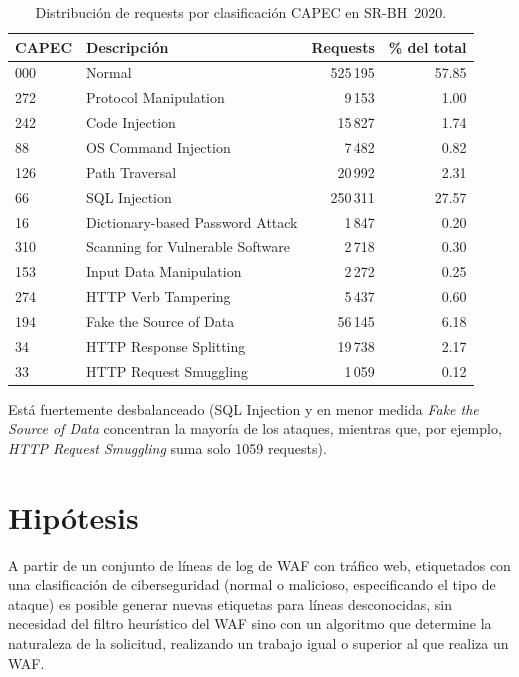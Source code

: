 \documentclass[12pt, a4paper]{article}
\begin{document}
\begin{table}[t]
\centering
\caption{Distribución de requests por clasificación CAPEC en SR-BH~2020.}
\label{tab:srbh-capec}
\begin{tabular}{llrr}
\toprule
CAPEC & Descripción & Requests & \% del total \\
\midrule
000 & Normal                              & 525\,195 & 57.85 \\
272 & Protocol Manipulation               &   9\,153 &  1.00 \\
242 & Code Injection                      &  15\,827 &  1.74 \\
88  & OS Command Injection                &   7\,482 &  0.82 \\
126 & Path Traversal                      &  20\,992 &  2.31 \\
66  & SQL Injection                       & 250\,311 & 27.57 \\
16  & Dictionary-based Password Attack    &   1\,847 &  0.20 \\
310 & Scanning for Vulnerable Software    &   2\,718 &  0.30 \\
153 & Input Data Manipulation             &   2\,272 &  0.25 \\
274 & HTTP Verb Tampering                 &   5\,437 &  0.60 \\
194 & Fake the Source of Data             &  56\,145 &  6.18 \\
34  & HTTP Response Splitting             &  19\,738 &  2.17 \\
33  & HTTP Request Smuggling              &   1\,059 &  0.12 \\
\bottomrule
\end{tabular}
\end{table}

Está fuertemente desbalanceado (SQL Injection y en menor medida \textit{Fake the Source of Data} concentran la mayoría de los ataques, mientras que, por ejemplo, \textit{HTTP Request Smuggling} suma solo 1059 requests).

\section{Hipótesis}

\vspace{0.2cm}
A partir de un conjunto de líneas de log de WAF con tráfico web, etiquetados con una clasificación de ciberseguridad (normal o malicioso, especificando el tipo de ataque) es posible generar nuevas etiquetas para líneas desconocidas, sin necesidad del filtro heurístico del WAF sino con un algoritmo que determine la naturaleza de la solicitud, realizando un trabajo igual o superior al que realiza un WAF.
\end{document}
